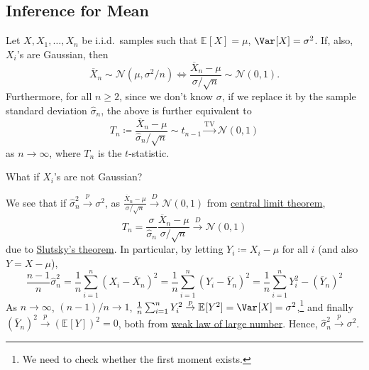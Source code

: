 \subsection{Inference for Mean}
Let \(X, X_1, \dots , X_n\) be i.i.d.\ samples such that \(\mathbb{E}_{}[X] = \mu \), \(\Var_{}[X] = \sigma ^2\). If, also, \(X_i\)'s are Gaussian, then
\[
	\overline{X} _n \sim \mathcal{N} (\mu , \sigma ^2 / n)
	\iff \frac{\overline{X} _n - \mu }{\sigma / \sqrt{n} } \sim \mathcal{N} (0, 1).
\]
Furthermore, for all \(n \geq 2\), since we don't know \(\sigma \), if we replace it by the sample standard deviation \(\hat{\sigma} _n\), the above is further equivalent to
\[
	T_n \coloneqq \frac{\overline{X} _n - \mu }{\hat{\sigma} _n / \sqrt{n} } \sim t_{n-1} \overset{\operatorname{TV}}{\to } \mathcal{N} (0, 1)
\]
as \(n \to \infty \), where \(T_n\) is the \(t\)-statistic.

\begin{problem*}
	What if \(X_i\)'s are not Gaussian?
\end{problem*}
\begin{answer}
	We see that if \(\hat{\sigma} _n ^2 \overset{p}{\to } \sigma ^2\), as \(\frac{\overline{X} _n - \mu }{\sigma / \sqrt{n} } \overset{D}{\to} \mathcal{N} (0, 1)\) from \hyperref[thm:CLT]{central limit theorem},
	\[
		T_n
		= \frac{\sigma }{\hat{\sigma} _n} \frac{\overline{X} _n - \mu }{\sigma / \sqrt{n} }
		\overset{D}{\to} \mathcal{N} (0, 1)
	\]
	due to \hyperref[col:Slutsky]{Slutsky's theorem}. In particular, by letting \(Y_i \coloneqq X_i - \mu \) for all \(i\) (and also \(Y = X - \mu \)),
	\[
		\frac{n-1}{n} \hat{\sigma} _n^2
		= \frac{1}{n} \sum_{i=1}^{n} \left( X_i - \overline{X} _n\right) ^2
		= \frac{1}{n} \sum_{i=1}^{n} \left( Y_i - \overline{Y} _n\right) ^2
		= \frac{1}{n} \sum_{i=1}^{n} Y_i^2 - (\overline{Y} _n)^2
	\]
	As \(n \to \infty \), \((n-1) / n \to 1\), \(\frac{1}{n} \sum_{i=1}^{n} Y_i^2 \overset{p}{\to } \mathbb{E}_{}[Y^2] = \Var_{}[X] = \sigma ^2\),\footnote{We need to check whether the first moment exists.} and finally \((\overline{Y} _n)^2 \overset{p}{\to } (\mathbb{E}_{}[Y])^2 = 0\), both from \hyperref[thm:WLLN]{weak law of large number}. Hence, \(\hat{\sigma} _n^2 \overset{p}{\to } \sigma ^2\).
\end{answer}

